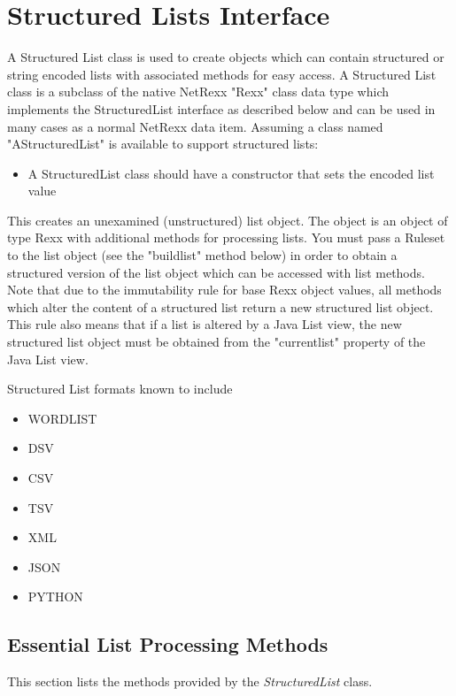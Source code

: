 \section{Structured Lists Interface}\label{reflists}
 
A Structured List class is used to create objects which can contain
structured or string encoded lists with associated methods for easy
access. A Structured List class is a subclass of the native NetRexx
"Rexx" class data type which implements the StructuredList interface
as described below and can be used in many cases as a normal NetRexx
data item. Assuming a class named "AStructuredList" is available to
support structured lists:

\begin{itemize}
\item A StructuredList class should have a constructor that sets the
  encoded list value
\end{itemize}
 
This creates an unexamined (unstructured) list object. The object is
an object of type Rexx with additional methods for processing lists. You
must pass a Ruleset to the list object (see the "buildlist" method
below) in order to obtain a structured version of the list object
which can be accessed with list methods. Note that due to the
immutability rule for base Rexx object values, all methods which alter
the content of a structured list return a new structured list
object. This rule also means that if a list is altered by a Java List
view, the new structured list object must be obtained from the
"currentlist" property of the Java List view. 

Structured List formats
known to \nr{} include 
\begin{itemize}
\item WORDLIST
\item DSV
\item CSV
\item TSV
\item XML
\item JSON
\item PYTHON
\end{itemize}

\subsection{Essential List Processing Methods}
This section lists the methods provided by the \emph{StructuredList}
class.

